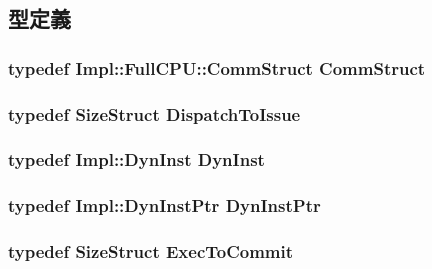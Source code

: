 \subsection{型定義}
\hypertarget{classBackEnd_a82fb3c7183ba777a05c510ab2fbcfb82}{
\subsubsection[{CommStruct}]{\setlength{\rightskip}{0pt plus 5cm}typedef Impl::FullCPU::CommStruct {\bf CommStruct}}}
\label{classBackEnd_a82fb3c7183ba777a05c510ab2fbcfb82}
\hypertarget{classBackEnd_a99d236038ce57aa3ef78858228c5f972}{
\subsubsection[{DispatchToIssue}]{\setlength{\rightskip}{0pt plus 5cm}typedef {\bf SizeStruct} {\bf DispatchToIssue}}}
\label{classBackEnd_a99d236038ce57aa3ef78858228c5f972}
\hypertarget{classBackEnd_ab741745c86a14c765b999c11167636d9}{
\subsubsection[{DynInst}]{\setlength{\rightskip}{0pt plus 5cm}typedef Impl::DynInst {\bf DynInst}}}
\label{classBackEnd_ab741745c86a14c765b999c11167636d9}
\hypertarget{classBackEnd_a028ce10889c5f6450239d9e9a7347976}{
\subsubsection[{DynInstPtr}]{\setlength{\rightskip}{0pt plus 5cm}typedef Impl::DynInstPtr {\bf DynInstPtr}}}
\label{classBackEnd_a028ce10889c5f6450239d9e9a7347976}
\hypertarget{classBackEnd_a91ea582041466725b4b17ce19f98685f}{
\subsubsection[{ExecToCommit}]{\setlength{\rightskip}{0pt plus 5cm}typedef {\bf SizeStruct} {\bf ExecToCommit}}}
\label{classBackEnd_a91ea582041466725b4b17ce19f98685f}
